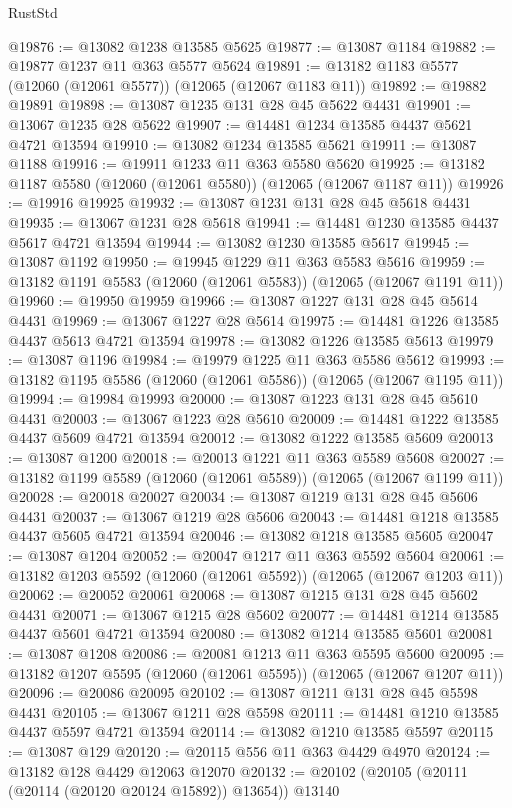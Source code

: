\begin{lexlean}{RustStd}
\begin{coremodule}
@19876 := @13082 @1238 @13585 @5625
@19877 := @13087 @1184
@19882 := @19877 @1237 @11 @363 @5577 @5624
@19891 := @13182 @1183 @5577 (@12060 (@12061 @5577)) (@12065 (@12067 @1183 @11))
@19892 := @19882 @19891
@19898 := @13087 @1235 @131 @28 @45 @5622 @4431
@19901 := @13067 @1235 @28 @5622
@19907 := @14481 @1234 @13585 @4437 @5621 @4721 @13594
@19910 := @13082 @1234 @13585 @5621
@19911 := @13087 @1188
@19916 := @19911 @1233 @11 @363 @5580 @5620
@19925 := @13182 @1187 @5580 (@12060 (@12061 @5580)) (@12065 (@12067 @1187 @11))
@19926 := @19916 @19925
@19932 := @13087 @1231 @131 @28 @45 @5618 @4431
@19935 := @13067 @1231 @28 @5618
@19941 := @14481 @1230 @13585 @4437 @5617 @4721 @13594
@19944 := @13082 @1230 @13585 @5617
@19945 := @13087 @1192
@19950 := @19945 @1229 @11 @363 @5583 @5616
@19959 := @13182 @1191 @5583 (@12060 (@12061 @5583)) (@12065 (@12067 @1191 @11))
@19960 := @19950 @19959
@19966 := @13087 @1227 @131 @28 @45 @5614 @4431
@19969 := @13067 @1227 @28 @5614
@19975 := @14481 @1226 @13585 @4437 @5613 @4721 @13594
@19978 := @13082 @1226 @13585 @5613
@19979 := @13087 @1196
@19984 := @19979 @1225 @11 @363 @5586 @5612
@19993 := @13182 @1195 @5586 (@12060 (@12061 @5586)) (@12065 (@12067 @1195 @11))
@19994 := @19984 @19993
@20000 := @13087 @1223 @131 @28 @45 @5610 @4431
@20003 := @13067 @1223 @28 @5610
@20009 := @14481 @1222 @13585 @4437 @5609 @4721 @13594
@20012 := @13082 @1222 @13585 @5609
@20013 := @13087 @1200
@20018 := @20013 @1221 @11 @363 @5589 @5608
@20027 := @13182 @1199 @5589 (@12060 (@12061 @5589)) (@12065 (@12067 @1199 @11))
@20028 := @20018 @20027
@20034 := @13087 @1219 @131 @28 @45 @5606 @4431
@20037 := @13067 @1219 @28 @5606
@20043 := @14481 @1218 @13585 @4437 @5605 @4721 @13594
@20046 := @13082 @1218 @13585 @5605
@20047 := @13087 @1204
@20052 := @20047 @1217 @11 @363 @5592 @5604
@20061 := @13182 @1203 @5592 (@12060 (@12061 @5592)) (@12065 (@12067 @1203 @11))
@20062 := @20052 @20061
@20068 := @13087 @1215 @131 @28 @45 @5602 @4431
@20071 := @13067 @1215 @28 @5602
@20077 := @14481 @1214 @13585 @4437 @5601 @4721 @13594
@20080 := @13082 @1214 @13585 @5601
@20081 := @13087 @1208
@20086 := @20081 @1213 @11 @363 @5595 @5600
@20095 := @13182 @1207 @5595 (@12060 (@12061 @5595)) (@12065 (@12067 @1207 @11))
@20096 := @20086 @20095
@20102 := @13087 @1211 @131 @28 @45 @5598 @4431
@20105 := @13067 @1211 @28 @5598
@20111 := @14481 @1210 @13585 @4437 @5597 @4721 @13594
@20114 := @13082 @1210 @13585 @5597
@20115 := @13087 @129
@20120 := @20115 @556 @11 @363 @4429 @4970
@20124 := @13182 @128 @4429 @12063 @12070
@20132 := @20102 (@20105 (@20111 (@20114 (@20120 @20124 @15892)) @13654)) @13140

\end{coremodule}
\end{lexlean}

